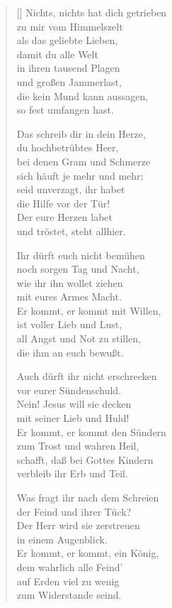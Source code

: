 \begin{multicols}{2}
\begin{verse}[\versewidth]
   Nichts, nichts hat dich getrieben\\
  zu mir vom Himmelszelt\\
  als das geliebte Lieben,\\
  damit du alle Welt\\
  in ihren tausend Plagen\\
  und großen Jammerlast,\\
  die kein Mund kann aussagen,\\
  so fest umfangen hast.

   Das schreib dir in dein Herze,\\
  du hochbetrübtes Heer,\\
  bei denen Gram und Schmerze\\
  sich häuft je mehr und mehr;\\
  seid unverzagt, ihr habet\\
  die Hilfe vor der Tür!\\
  Der eure Herzen labet\\
  und tröstet, steht allhier.

   Ihr dürft euch nicht bemühen\\
  noch sorgen Tag und Nacht,\\
  wie ihr ihn wollet ziehen\\
  mit eures Armes Macht.\\
  Er kommt, er kommt mit Willen,\\
  ist voller Lieb und Lust,\\
  all Angst und Not zu stillen,\\
  die ihm an euch bewußt.

   Auch dürft ihr nicht erschrecken\\
  vor eurer Sündenschuld.\\
  Nein! Jesus will sie decken\\
  mit seiner Lieb und Huld!\\
  Er kommt, er kommt den Sündern\\
  zum Trost und wahren Heil,\\
  schafft, daß bei Gottes Kindern\\
  verbleib ihr Erb und Teil.

   Was fragt ihr nach dem Schreien\\
  der Feind und ihrer Tück?\\
  Der Herr wird sie zerstreuen\\%
  in einem Augenblick.\\
  Er kommt, er kommt, ein König,\\
  dem wahrlich alle Feind'\\
  auf Erden viel zu wenig\\
  zum Widerstande seind.


\end{verse}
\end{multicols}
